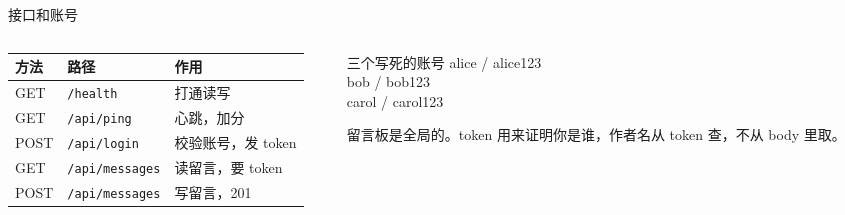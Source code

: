 \documentclass[aspectratio=169,11pt,professionalfonts]{ctexbeamer}
\begin{document}
\begin{frame}{接口和账号}
\begin{columns}[T,onlytextwidth]
\begin{column}{0.56\textwidth}
{\footnotesize
\begin{tabular}{@{}lll@{}}
\toprule
方法 & 路径 & 作用 \\
\midrule
GET & \texttt{/health} & 打通读写 \\
GET & \texttt{/api/ping} & 心跳，加分 \\
POST & \texttt{/api/login} & 校验账号，发 token \\
GET & \texttt{/api/messages} & 读留言，要 token \\
POST & \texttt{/api/messages} & 写留言，201 \\
\bottomrule
\end{tabular}
}
\end{column}
\begin{column}{0.40\textwidth}
\begin{block}{三个写死的账号}
alice / alice123\\
bob / bob123\\
carol / carol123
\end{block}
\vspace{0.4em}
{\small 留言板是全局的。token 用来证明你是谁，作者名从 token 查，不从 body 里取。}
\end{column}
\end{columns}
\end{frame}
\end{document}
